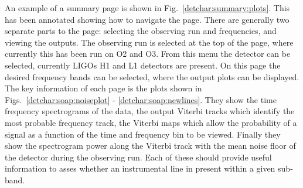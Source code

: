 An example of a summary page is shown in Fig.~\ref{detchar:summary:plots}. This
has been annotated showing how to navigate the page.  There are generally two
separate parts to the page: selecting the observing run and frequencies, and
viewing the outputs.  The observing run is selected at the top of the page,
where currently this has been run on O2 and O3.  From this menu the
detector can be selected, currently \glspl{LIGO} H1 and L1 detectors are
present. On this page the desired frequency bands can be selected, where the output plots can be displayed. 
The key information of each page is the plots shown in
Figs.~\ref{detchar:soap:noiseplot} - \ref{detchar:soap:newlines}.
They show the time frequency spectrograms of the data, the output Viterbi tracks which
identify the most probable frequency track, the Viterbi maps which allow the
probability of a signal as a function of the time and frequency bin to be
viewed.  Finally they show the spectrogram power along the Viterbi track with
the mean noise floor of the detector during the observing run.  Each of these should
provide useful information to asses whether an instrumental line in
present within a given sub-band.

